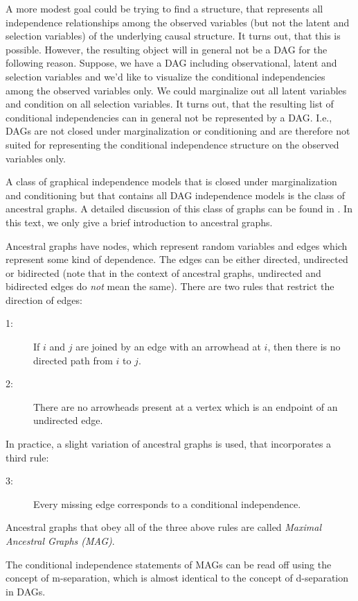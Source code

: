 \documentclass[article]{jss}
\begin{document}
A more modest goal could be trying to find a structure, that represents all
independence relationships among the observed variables (but not the latent
and selection variables) of the underlying causal structure. It turns out,
that this is possible. However, the resulting object will in general not be
a DAG for the following reason. Suppose, we have a DAG including
observational, latent and selection variables and we'd like to visualize
the conditional independencies among the observed variables only. We could
marginalize out all latent variables and condition on all selection
variables. It turns out, that the resulting list of conditional
independencies can in general not be represented by a DAG. I.e., DAGs are
not closed under marginalization or conditioning and are therefore not
suited for representing the conditional independence structure on the
observed variables only.

A class of graphical independence models that is closed under
marginalization and conditioning but that contains all DAG independence
models is the class of ancestral graphs. A detailed discussion of this
class of graphs can be found in \cite{RichardsonSpirtes02}. In this text,
we only give a brief introduction to ancestral graphs.

Ancestral graphs have nodes, which represent random variables and edges
which represent some kind of dependence. The edges can be either directed,
undirected or bidirected (note that in the context of ancestral graphs,
undirected and bidirected edges do \emph{not} mean the same). There are two
rules that restrict the direction of edges:
\begin{description}
  \item[1:] If $i$ and $j$ are joined by an edge with an arrowhead at $i$, then
    there is no directed path from $i$ to $j$.
  \item[2:] There are no arrowheads present at a vertex which is an
    endpoint of an undirected edge.
\end{description}
In practice, a slight variation of ancestral graphs is used, that
incorporates a third rule:
\begin{description}
\item[3:] Every missing edge corresponds to a conditional independence.
\end{description}
Ancestral graphs that obey all of the three above rules are called
\emph{Maximal Ancestral Graphs (MAG)}. 

The conditional independence statements of MAGs can be read off using the concept
of m-separation, which is almost identical to the concept of d-separation
in DAGs.
\end{document}
